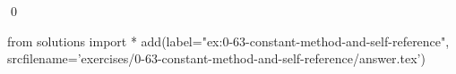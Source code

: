 
\begin{ex}
  \label{ex:0-63-constant-method-and-self-reference}
  
  \qed
\end{ex}
\begin{python0}
from solutions import *
add(label="ex:0-63-constant-method-and-self-reference",
    srcfilename='exercises/0-63-constant-method-and-self-reference/answer.tex')
\end{python0}
